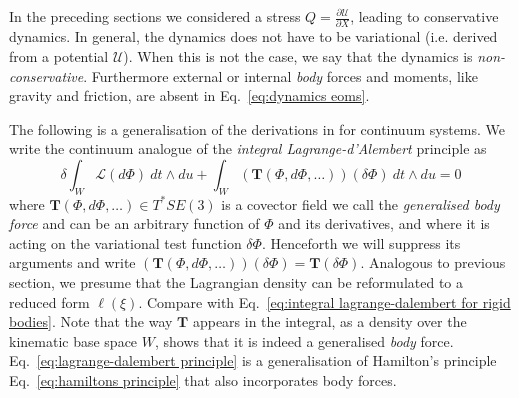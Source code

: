 In the preceding sections we considered a stress $Q = \frac{\partial \mathcal{U}}{\partial X}$, leading to conservative dynamics. In general, the dynamics does not have to be variational (i.e. derived from a potential $\mathcal{U}$). When this is not the case, we say that the dynamics is \textit{non-conservative}. Furthermore external or internal \textit{body} forces and moments, like gravity and friction, are absent in Eq.~\ref{eq:dynamics eoms}.

The following is a generalisation of the derivations in \citep{wisniewskiEulerPoincarReductionExternally, poincareFormeNouvelleEquations1901, marleHenriPoincareNote2013} for continuum systems. We write the continuum analogue of the \textit{integral Lagrange-d'Alembert} principle as \citep{marsdenIntroductionMechanicsSymmetry2013, holmEulerPoincareEquations1998}
\begin{equation} \label{eq:lagrange-dalembert principle}
\delta \int_W \mathcal{L}(d\Phi)\ dt \wedge du + \int_W (\mathbf{T}(\Phi, d\Phi, \dots))(\delta \Phi)\ dt \wedge du = 0 
\end{equation}
where $\mathbf{T}(\Phi, d\Phi, \dots) \in T^*SE(3)$ is a covector field we call the \textit{generalised body force} and can be an arbitrary function of $\Phi$ and its derivatives, and where it is acting on the variational test function $\delta \Phi$. Henceforth we will suppress its arguments and write $(\mathbf{T}(\Phi, d\Phi, \dots))(\delta \Phi) = \mathbf{T}(\delta \Phi)$. Analogous to previous section, we presume that the Lagrangian density can be reformulated to a reduced form $\ell(\xi)$. Compare with Eq.~\ref{eq:integral lagrange-dalembert for rigid bodies}. Note that the way $\mathbf{T}$ appears in the integral, as a density over the kinematic base space $W$, shows that it is indeed a generalised \textit{body} force. Eq.~\ref{eq:lagrange-dalembert principle} is a generalisation of Hamilton's principle Eq.~\ref{eq:hamiltons principle} that also incorporates body forces.

